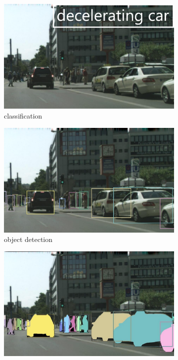 \begin{figure}[H]
    \centering
    
    \begin{subfigure}{0.328\textwidth}
        \includegraphics[width=\linewidth]{PICs/differentApproaches/classification_v2.jpg}
        \caption{classification}
        \label{fig:differentApproaches_classification}
    \end{subfigure}
    \hfill
    \begin{subfigure}{0.328\textwidth}
        \includegraphics[width=\linewidth]{PICs/differentApproaches/object_detection.jpg}
        \caption{object detection}
        \label{fig:differentApproaches_object_detection}
    \end{subfigure}
    \hfill
    \begin{subfigure}{0.328\textwidth}
        \includegraphics[width=\linewidth]{PICs/differentApproaches/instance_segmentation_v2.jpg}

\end{subfigure}
\end{figure}
